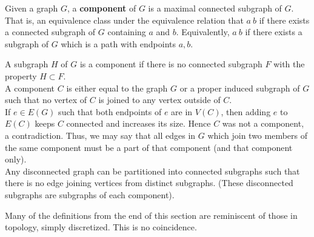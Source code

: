 \begin{definition}[Components]
	Given a graph $G$, a \textbf{component} of $G$ is a maximal connected subgraph of $G$. That is, an equivalence class under the equivalence relation that $a ~ b$ if there exists a connected subgraph of $G$ containing $a$ and $b$. Equivalently, $a ~ b$ if there exists a subgraph of $G$ which is a path with endpoints $a, b$.
\end{definition}
\begin{remarks}
	A subgraph $H$ of $G$ is a component if there is no connected subgraph $F$ with the property $H \subset F$.\\
	A component $C$ is either equal to the graph $G$ or a proper induced subgraph of $G$ such that no vertex of $C$ is joined to any vertex outside of $C$.\\
	If $e \in E\left( G \right) $ such that both endpoints of $e$ are in $ V\left( C \right) $, then adding $e$ to $E\left( C \right) $ keeps $C$ connected and increases its size. Hence $C$ was not a component, a contradiction. Thus, we may say that all edges in $G$ which join two members of the same component must be a part of that component (and that component only).\\
	Any disconnected graph can be partitioned into connected subgraphs such that there is no edge joining vertices from distinct subgraphs. (These disconnected subgraphs are subgraphs of each component).
\end{remarks}
Many of the definitions from the end of this section are reminiscent of those in topology, simply discretized. This is no coincidence.
